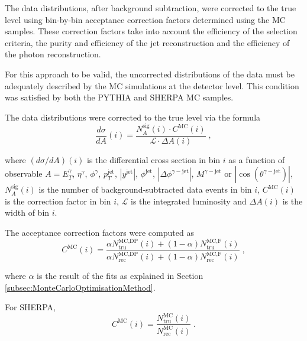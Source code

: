 \documentclass[12pt, twoside]{article}
\numberwithin{equation}{section}
\numberwithin{figure}{section}
\begin{document}
The data distributions, after background subtraction, were corrected to the true level using bin-by-bin acceptance correction factors determined using the MC samples. These correction factors take into account the efficiency of the selection criteria, the purity and efficiency of the jet reconstruction and the efficiency of the photon reconstruction.

For this approach to be valid, the uncorrected distributions of the data must be adequately described by the MC simulations at the detector level. This condition was satisfied by both the PYTHIA and SHERPA MC samples.

The data distributions were corrected to the true level via the formula
\begin{equation}    \label{eq:DifferentialCrossSectionData}
    \frac{d \sigma}{d A} (i) = \frac{N^{\text{sig}}_{A}(i) \cdot C^{\text{MC}}(i)}{\mathcal{L} \cdot \Delta A(i)} \; ,
\end{equation}

where $\left( d \sigma / d A \right)(i)$ is the differential cross section in bin $i$ as a function of observable $A = E^{\gamma}_{T}$, $\eta^{\gamma}$, $\phi^{\gamma}$, $p^{\text{jet}}_{T}$, $\left| y^{\text{jet}} \right|$, $\phi^{\text{jet}}$, $\left| \Delta \phi^{\gamma-\text{jet}} \right|$, $M^{\gamma-\text{jet}}$ or $\left| \cos \left( \theta^{\gamma-\text{jet}} \right) \right|$, $N^{\text{sig}}_{A}(i)$ is the number of background-subtracted data events in bin $i$, $C^{\text{MC}}(i)$ is the correction factor in bin $i$, $\mathcal{L}$ is the integrated luminosity and $\Delta A(i)$ is the width of bin $i$.

The acceptance correction factors were computed as
\begin{equation}    \label{eq:AcceptanceCorrectionFactorPythia}
    C^{\text{MC}}(i) = \frac{\alpha N^{\text{MC,DP}}_{\text{tru}}(i) + (1-\alpha)N^{\text{MC,F}}_{\text{tru}}(i)}{\alpha N^{\text{MC,DP}}_{\text{rec}}(i) + (1-\alpha)N^{\text{MC,F}}_{\text{rec}}(i)} \; ,
\end{equation}

where $\alpha$ is the result of the fits as explained in Section \ref{subsec:MonteCarloOptimisationMethod}.

For SHERPA,
\begin{equation}    \label{eq:AcceptanceCorrectionFactorSherpa}
    C^{\text{MC}}(i) = \frac{N^{\text{MC}}_{\text{tru}}(i)}{N^{\text{MC}}_{\text{rec}}(i)} \; .
\end{equation}
\end{document}
